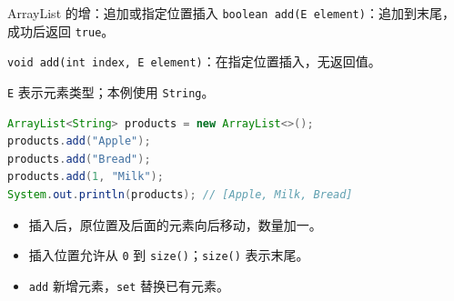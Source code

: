 \documentclass[aspectratio=169]{beamer}
\begin{document}
\begin{frame}[fragile]{ArrayList 的增：追加或指定位置插入}
  \texttt{boolean add(E element)}：追加到末尾，成功后返回 \texttt{true}。
  \par
  \texttt{void add(int index, E element)}：在指定位置插入，无返回值。
  \par\medskip
  \texttt{E} 表示元素类型；本例使用 \texttt{String}。
  \begin{lstlisting}[language=Java]
ArrayList<String> products = new ArrayList<>();
products.add("Apple");
products.add("Bread");
products.add(1, "Milk");
System.out.println(products); // [Apple, Milk, Bread]
  \end{lstlisting}
  \begin{itemize}
    \item 插入后，原位置及后面的元素向后移动，数量加一。
    \item 插入位置允许从 \texttt{0} 到 \texttt{size()}；\texttt{size()} 表示末尾。
    \item \texttt{add} 新增元素，\texttt{set} 替换已有元素。
  \end{itemize}
\end{frame}
\end{document}
